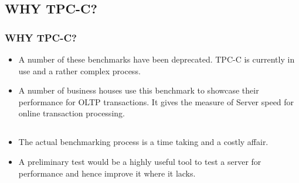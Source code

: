 \documentclass[12pt]{beamer}
\begin{document}
\subsection{WHY TPC-C?}
\begin{frame}[c]
\frametitle{WHY TPC-C?}
\begin{itemize}
 \item A number of these benchmarks have been deprecated. TPC-C is currently in use and a rather complex process.
 \item A number of business houses use this benchmark to showcase their performance for OLTP transactions. It gives the measure of Server speed for online transaction processing.
\end{itemize}

\end{frame}

\subsection{}
\begin{frame}[c]
\frametitle{}
\begin{itemize}
 \item The actual benchmarking process is a time taking and a costly affair.
 \item A preliminary test would be a highly useful tool to test a server for performance and hence improve it where it lacks. 
\end{itemize}

\end{frame}
\end{document}
